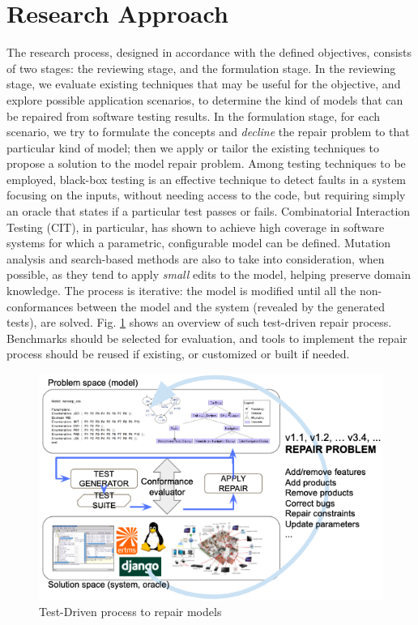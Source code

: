 
\section{Research Approach}\label{sec:researchapproach}
The research process, designed in accordance with the defined objectives, consists of two stages: the reviewing stage, and the formulation stage.
In the reviewing stage, we evaluate existing techniques that may be useful for the objective, and explore possible application scenarios, to determine the kind of models that can be repaired from software testing results.
In the formulation stage, for each scenario, we try to formulate the concepts and \textit{decline} the repair problem to that particular kind of model; then we apply or tailor the existing techniques to propose a solution to the model repair problem.
Among testing techniques to be employed, black-box testing is an effective technique to detect faults in a system focusing on the inputs, without needing access to the code, but requiring simply an oracle that states if a particular test %
passes or fails. 
Combinatorial Interaction Testing (CIT), in particular, has shown to achieve high coverage in software systems for which a parametric, configurable model can be defined. Mutation analysis and search-based methods are also to take into consideration, when possible, as they tend to apply \textit{small} edits to the model, helping preserve domain knowledge.
The process is iterative: the model is modified until all the non-conformances between the model and the system (revealed by the generated tests), are solved. Fig. \ref{fig:researchapproach} shows an overview of such test-driven repair process. 
Benchmarks should be selected for evaluation, and tools to implement the repair process should be reused if existing, or customized or built if needed.%

\begin{figure}[!htb]
	\centering
	\includegraphics[width=.8\columnwidth]{images/repair.png}
	\caption{Test-Driven process to repair models}
	\label{fig:researchapproach}
\end{figure}

